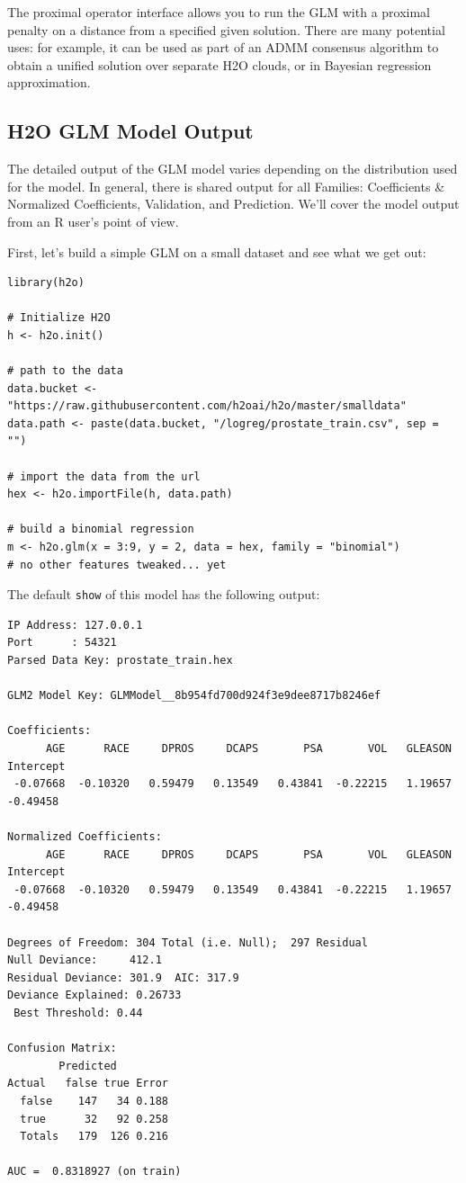 \documentclass[11pt]{article}
\begin{document}
The proximal operator interface allows you to run the GLM with a proximal penalty on a distance from a specified given solution. There are many potential uses: for example, it can be used as part of an ADMM consensus algorithm to obtain a unified solution over separate H2O clouds, or in Bayesian regression approximation.

\subsection{H2O GLM Model Output}
The detailed output of the GLM model varies depending on the distribution used for the model. In general, there is shared output for all Families: Coefficients \& Normalized Coefficients, Validation, and Prediction. We'll cover the model output from an R user's  point of view.

First, let's build a simple GLM on a small dataset and see what we get out:

\begin{lstlisting}[style=R]
library(h2o)

# Initialize H2O
h <- h2o.init()

# path to the data
data.bucket <- "https://raw.githubusercontent.com/h2oai/h2o/master/smalldata"
data.path <- paste(data.bucket, "/logreg/prostate_train.csv", sep = "")

# import the data from the url
hex <- h2o.importFile(h, data.path)

# build a binomial regression
m <- h2o.glm(x = 3:9, y = 2, data = hex, family = "binomial")  
# no other features tweaked... yet
\end{lstlisting}

The default \texttt{show} of this model has the following output:

\begin{lstlisting}[style=output]
IP Address: 127.0.0.1 
Port      : 54321 
Parsed Data Key: prostate_train.hex 

GLM2 Model Key: GLMModel__8b954fd700d924f3e9dee8717b8246ef

Coefficients:
      AGE      RACE     DPROS     DCAPS       PSA       VOL   GLEASON Intercept 
 -0.07668  -0.10320   0.59479   0.13549   0.43841  -0.22215   1.19657  -0.49458 

Normalized Coefficients:
      AGE      RACE     DPROS     DCAPS       PSA       VOL   GLEASON Intercept 
 -0.07668  -0.10320   0.59479   0.13549   0.43841  -0.22215   1.19657  -0.49458 

Degrees of Freedom: 304 Total (i.e. Null);  297 Residual
Null Deviance:     412.1
Residual Deviance: 301.9  AIC: 317.9
Deviance Explained: 0.26733 
 Best Threshold: 0.44

Confusion Matrix:
        Predicted
Actual   false true Error
  false    147   34 0.188
  true      32   92 0.258
  Totals   179  126 0.216

AUC =  0.8318927 (on train) 
\end{lstlisting}
\end{document}
